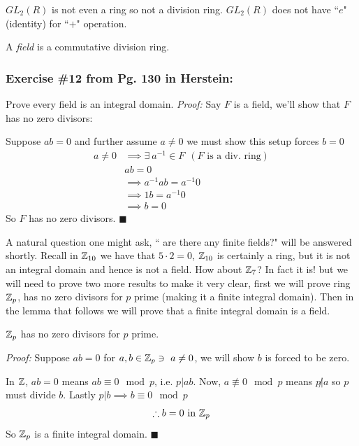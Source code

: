 \begin{example}
    $GL_2(R)$ is not even a ring so not a division ring. $GL_2(R)$ does not have ``$e$" (identity)
    for ``$+$" operation.
\end{example}

\begin{definition}[Field]
A \textit{field} is a commutative division ring.
\end{definition}

\subsubsection*{Exercise \#12 from Pg. 130 in Herstein:}
Prove every field is an integral domain.
\textit{Proof:} Say $F$ is a field, we'll show that $F$ has no zero divisors: \steezybreak

\noindent Suppose $ab=0$ and further assume $a\neq 0$ we must show this setup forces $b=0$
\begin{align}
    a\neq 0 &\implies \exists \ a^{-1}\in F \ \ (F\text{ is a div. ring}) \nonumber \\
    &ab=0 \nonumber \\
    &\implies a^{-1}ab =a^{-1}0 \nonumber \\
    &\implies 1b = a^{-1}0 \nonumber \\
    &\implies b=0 \nonumber
\end{align}
So $F$ has no zero divisors. $\blacksquare$ \steezybreak

A natural question one might ask, `` are there any finite fields?" will be answered shortly. Recall
in ${\mathbb{Z}}_{10}$ we have that $5\cdot 2 = 0$, ${\mathbb{Z}}_{10}$ is certainly a ring, but it is not an integral
domain and hence is not a field. How about ${\mathbb{Z}}_{7}$? In fact it is! but we will need to prove two
more results to make it very clear, first we will prove ring ${\mathbb{Z}}_p$, has no zero divisors for $p$
prime (making it a finite integral domain). Then in the lemma that follows we will prove that a
finite integral domain is a field.

\begin{proposition}
${\mathbb{Z}}_p$ has no zero divisors for $p$ prime. \steezybreak

\noindent \textit{Proof:} Suppose $ab=0$ for $a,b \in {\mathbb{Z}}_p \ni \ a\neq 0$, we will show $b$ is
forced to be zero.

\noindent In ${\mathbb{Z}}$, $ab=0$ means $ab\equiv 0 \mod p$, i.e. $p|ab$. Now, $a\not\equiv 0 \mod p$ means
$p\not | a$ so $p$ must divide $b$. Lastly $p|b \implies b\equiv 0 \mod p$
\begin{align}
    \therefore b=0 \text{ in } {\mathbb{Z}}_p \nonumber
\end{align}
So ${\mathbb{Z}}_p$ is a finite integral domain. $\blacksquare$
\end{proposition}

